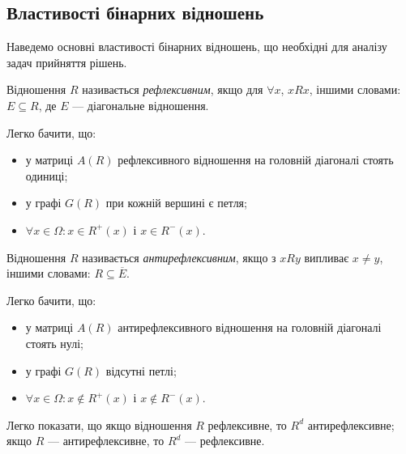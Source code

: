 \subsection{Властивості бінарних відношень}

Наведемо основні властивості бінарних відношень, що необхідні для аналізу задач прийняття рішень.

\begin{definition}
	Відношення $R$ називається \textit{рефлексивним}, якщо для $\forall x$, $x R x$, іншими словами: $E \subseteq R$, де $E$ --- діагональне відношення.
\end{definition}

\begin{properties}
	Легко бачити, що:
	\begin{itemize}
		\item у матриці $A(R)$ рефлексивного відношення на головній діагоналі стоять одиниці;
		\item у графі $G(R)$ при кожній вершині є петля;
		\item $\forall x \in \Omega: x \in R^+(x)$ і $x \in R^-(x)$.
	\end{itemize}
\end{properties}

\begin{definition}
	Відношення $R$ називається \textit{антирефлексивним}, якщо з $x R y$ випливає $x \ne y$, іншими словами: $R \subseteq \overline{E}$.
\end{definition}
	 
\begin{properties}
	Легко бачити, що:
	\begin{itemize}
		\item у матриці $A(R)$ антирефлексивного відношення на головній діагоналі стоять нулі;
		\item у графі $G(R)$ відсутні петлі;
		\item $\forall x \in \Omega: x \notin R^+(x)$ і $x \notin R^-(x)$.
	\end{itemize}
\end{properties}

\begin{proposition}
	Легко показати, що якщо відношення $R$ рефлексивне, то $R^d$ антирефлексивне; якщо $R$ --- антирефлексивне, то $R^d$ --- рефлексивне.
\end{proposition}

